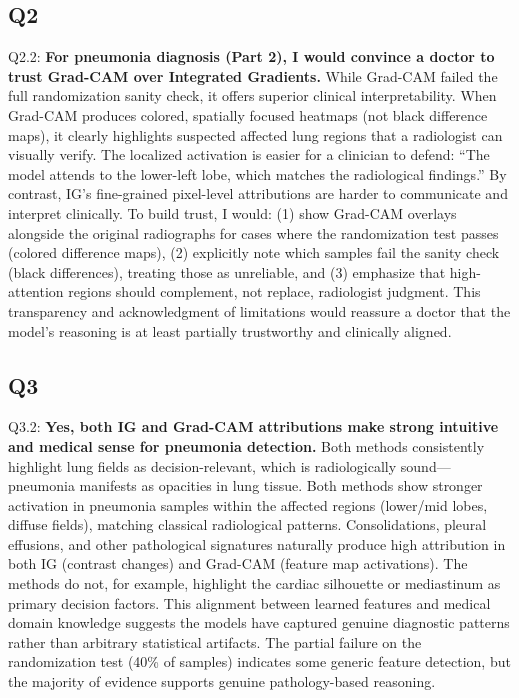 \subsection*{Q2}
Q2.2: \textbf{For pneumonia diagnosis (Part 2), I would convince a doctor to trust Grad-CAM over Integrated Gradients.} While Grad-CAM failed the full randomization sanity check, it offers superior clinical interpretability. When Grad-CAM produces colored, spatially focused heatmaps (not black difference maps), it clearly highlights suspected affected lung regions that a radiologist can visually verify. The localized activation is easier for a clinician to defend: ``The model attends to the lower-left lobe, which matches the radiological findings.'' By contrast, IG's fine-grained pixel-level attributions are harder to communicate and interpret clinically. To build trust, I would: (1) show Grad-CAM overlays alongside the original radiographs for cases where the randomization test passes (colored difference maps), (2) explicitly note which samples fail the sanity check (black differences), treating those as unreliable, and (3) emphasize that high-attention regions should complement, not replace, radiologist judgment. This transparency and acknowledgment of limitations would reassure a doctor that the model's reasoning is at least partially trustworthy and clinically aligned.

\subsection*{Q3}
Q3.2: \textbf{Yes, both IG and Grad-CAM attributions make strong intuitive and medical sense for pneumonia detection.} Both methods consistently highlight lung fields as decision-relevant, which is radiologically sound---pneumonia manifests as opacities in lung tissue. Both methods show stronger activation in pneumonia samples within the affected regions (lower/mid lobes, diffuse fields), matching classical radiological patterns. Consolidations, pleural effusions, and other pathological signatures naturally produce high attribution in both IG (contrast changes) and Grad-CAM (feature map activations). The methods do not, for example, highlight the cardiac silhouette or mediastinum as primary decision factors. This alignment between learned features and medical domain knowledge suggests the models have captured genuine diagnostic patterns rather than arbitrary statistical artifacts. The partial failure on the randomization test (40\% of samples) indicates some generic feature detection, but the majority of evidence supports genuine pathology-based reasoning.

